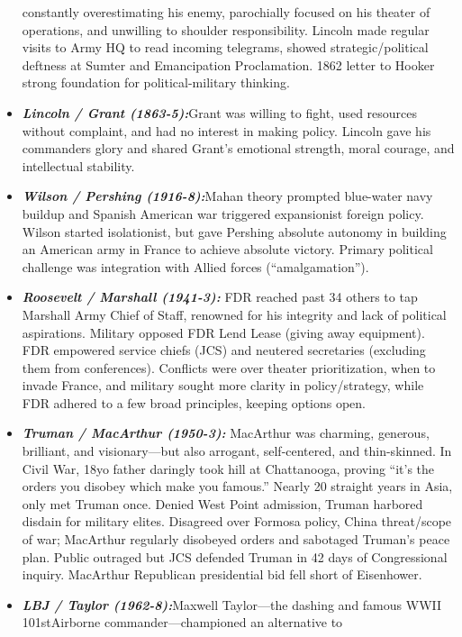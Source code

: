 \documentclass[
]{article}
\begin{document}
\begin{itemize}
  constantly overestimating his enemy, parochially focused on his
  theater of operations, and unwilling to shoulder responsibility.
  Lincoln made regular visits to Army HQ to read incoming telegrams,
  showed strategic/political deftness at Sumter and Emancipation
  Proclamation. 1862 letter to Hooker strong foundation for
  political-military thinking.
\item
  \textbf{\emph{Lincoln / Grant (1863-5):}}Grant was willing to fight,
  used resources without complaint, and had no interest in making
  policy. Lincoln gave his commanders glory and shared Grant's emotional
  strength, moral courage, and intellectual stability.
\item
  \textbf{\emph{Wilson / Pershing (1916-8):}}Mahan theory prompted
  blue-water navy buildup and Spanish American war triggered
  expansionist foreign policy. Wilson started isolationist, but gave
  Pershing absolute autonomy in building an American army in France to
  achieve absolute victory. Primary political challenge was integration
  with Allied forces (``amalgamation'').
\item
  \textbf{\emph{Roosevelt / Marshall (1941-3):}} FDR reached past 34
  others to tap Marshall Army Chief of Staff, renowned for his integrity
  and lack of political aspirations. Military opposed FDR Lend Lease
  (giving away equipment). FDR empowered service chiefs (JCS) and
  neutered secretaries (excluding them from conferences). Conflicts were
  over theater prioritization, when to invade France, and military
  sought more clarity in policy/strategy, while FDR adhered to a few
  broad principles, keeping options open.
\item
  \textbf{\emph{Truman / MacArthur (1950-3):}} MacArthur was charming,
  generous, brilliant, and visionary---but also arrogant, self-centered,
  and thin-skinned. In Civil War, 18yo father daringly took hill at
  Chattanooga, proving ``it's the orders you disobey which make you
  famous.'' Nearly 20 straight years in Asia, only met Truman once.
  Denied West Point admission, Truman harbored disdain for military
  elites. Disagreed over Formosa policy, China threat/scope of war;
  MacArthur regularly disobeyed orders and sabotaged Truman's peace
  plan. Public outraged but JCS defended Truman in 42 days of
  Congressional inquiry. MacArthur Republican presidential bid fell
  short of Eisenhower.
\item
  \textbf{\emph{LBJ / Taylor (1962-8):}}Maxwell Taylor---the dashing and
  famous WWII 101stAirborne commander---championed an alternative to

\end{itemize}
\end{document}
